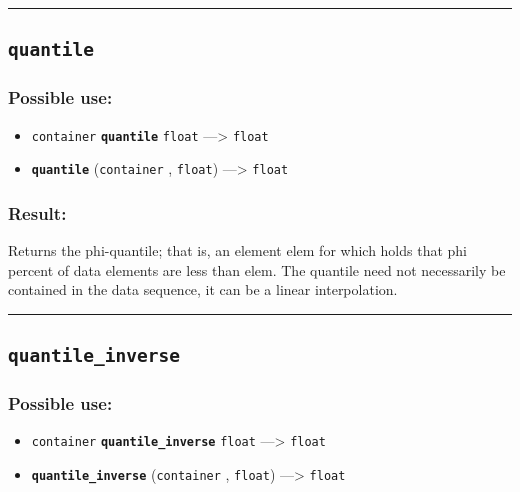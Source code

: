 \documentclass[]{book}
\providecommand{\tightlist}{%
  \setlength{\itemsep}{0pt}\setlength{\parskip}{0pt}}
\theoremstyle{definition}
\theoremstyle{definition}
\theoremstyle{definition}
\theoremstyle{remark}
\begin{document}
\begin{center}\rule{0.5\linewidth}{\linethickness}\end{center}

\subsection{\texorpdfstring{\texttt{quantile}}{quantile}}\label{quantile}

\subsubsection{Possible use:}\label{possible-use-424}

\begin{itemize}
\tightlist
\item
  \texttt{container} \textbf{\texttt{quantile}} \texttt{float}
  ---\textgreater{} \texttt{float}
\item
  \textbf{\texttt{quantile}} (\texttt{container} , \texttt{float})
  ---\textgreater{} \texttt{float}
\end{itemize}

\subsubsection{Result:}\label{result-410}

Returns the phi-quantile; that is, an element elem for which holds that
phi percent of data elements are less than elem. The quantile need not
necessarily be contained in the data sequence, it can be a linear
interpolation.

\begin{center}\rule{0.5\linewidth}{\linethickness}\end{center}

\subsection{\texorpdfstring{\texttt{quantile\_inverse}}{quantile\_inverse}}\label{quantile_inverse}

\subsubsection{Possible use:}\label{possible-use-425}

\begin{itemize}
\tightlist
\item
  \texttt{container} \textbf{\texttt{quantile\_inverse}} \texttt{float}
  ---\textgreater{} \texttt{float}
\item
  \textbf{\texttt{quantile\_inverse}} (\texttt{container} ,
  \texttt{float}) ---\textgreater{} \texttt{float}
\end{itemize}
\end{document}

